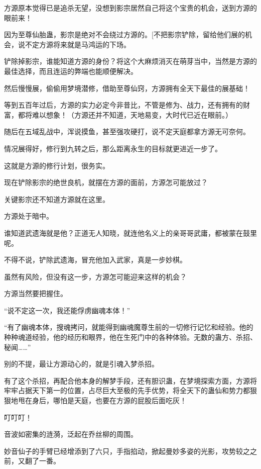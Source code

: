 
\begin{this_body}

方源原本觉得已是追杀无望，没想到影宗居然自己将这个宝贵的机会，送到方源的眼前来！

因为至尊仙胎蛊，影宗是绝对不会绕过方源的。[不把影宗铲除，留给他们展的机会，说不定方源将来就是马鸿运的下场。

铲除掉影宗，谁能知道方源的身份？将这个大麻烦消灭在萌芽当中，当然是方源的最佳选择，而且连运的弊端也能顺便解决。

然后慢慢展，偷偷用梦境潜修，借助至尊仙窍，方源拥有全天下最佳的展基础！

等到五百年过后，方源的实力必定今非昔比，不管是修为、战力，还有拥有的财富，都将难以想象！（方源还并不知道，天地易变，大时代已近在眼前。）

随后在五域乱战中，浑说摸鱼，甚至强攻硬打，说不定天庭都拿方源无可奈何。

情况展得好，修行到九转之后，那么距离永生的目标就更进近一步了。

这就是方源的修行计划，很务实。

现在铲除影宗的绝世良机，就摆在方源的面前，方源怎可能放过？

关键影宗还不知道方源就在这里。

方源处于暗中。

谁知道武遗海就是他？正道无人知晓，就连他名义上的亲哥哥武庸，都被蒙在鼓里呢。

不得不说，铲除武遗海，冒充他加入武家，真是一步妙棋。

虽然有风险，但没有这一步，方源怎可能迎来这样的机会？

方源当然要把握住。

“说不定这一次，我还能俘虏幽魂本体！”

“有了幽魂本体，搜魂拷问，就能得到幽魂魔尊生前的一切修行记忆和经验。他的种种魂道经验，他的经历和眼界，他在生死门中的各种体验。无数的蛊方、杀招、秘闻……”

别的不提，最让方源动心的，就是引魂入梦杀招。

有了这个杀招，再配合他本身的解梦手段，还有胆识蛊，在梦境探索方面，方源将牢牢占据天下第一的位置，占尽巨大至极的先手优势，将全天下的蛊仙和势力都狠狠地甩在身后，哪怕是天庭，也要在方源的屁股后面吃灰！

叮叮叮！

音波如密集的涟漪，泛起在乔丝柳的周围。

妙音仙子的手臂已经增添到了六只，手指掐动，掀起曼妙多姿的光影，攻势较之之前，又翻了一番。


\end{this_body}
